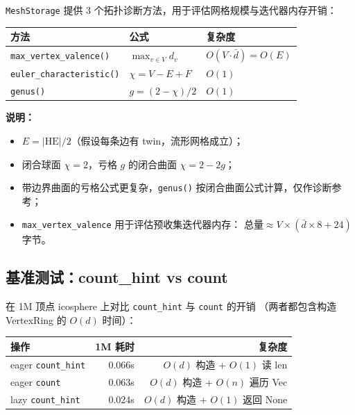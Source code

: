 \documentclass[11pt,a4paper]{article}
\begin{document}
\texttt{MeshStorage} 提供 3 个拓扑诊断方法，用于评估网格规模与迭代器内存开销：

\begin{center}
\renewcommand{\arraystretch}{1.18}
\begin{tabular}{@{}lll@{}}
  \toprule
  \textbf{方法} & \textbf{公式} & \textbf{复杂度} \\
  \midrule
  \texttt{max\_vertex\_valence()} & $\max_{v \in V} d_v$ & $O(V \cdot \bar{d}) = O(E)$ \\
  \texttt{euler\_characteristic()} & $\chi = V - E + F$ & $O(1)$ \\
  \texttt{genus()} & $g = (2 - \chi) / 2$ & $O(1)$ \\
  \bottomrule
\end{tabular}
\end{center}

\textbf{说明：}
\begin{itemize}
  \item $E = |\text{HE}| / 2$（假设每条边有 twin，流形网格成立）；
  \item 闭合球面 $\chi = 2$，亏格 $g$ 的闭合曲面 $\chi = 2 - 2g$；
  \item 带边界曲面的亏格公式更复杂，\texttt{genus()} 按闭合曲面公式计算，仅作诊断参考；
  \item \texttt{max\_vertex\_valence} 用于评估预收集迭代器内存：
        $\text{总量} \approx V \times (\bar{d} \times 8 + 24)$ 字节。
\end{itemize}

\subsection{基准测试：count\_hint vs count}

在 1M 顶点 icosphere 上对比 \texttt{count\_hint} 与 \texttt{count} 的开销
（两者都包含构造 VertexRing 的 $O(d)$ 时间）：

\begin{center}
\renewcommand{\arraystretch}{1.18}
\begin{tabular}{@{}lrr@{}}
  \toprule
  \textbf{操作} & \textbf{1M 耗时} & \textbf{复杂度} \\
  \midrule
  eager \texttt{count\_hint} & 0.066s & $O(d)$ 构造 + $O(1)$ 读 len \\
  eager \texttt{count}        & 0.063s & $O(d)$ 构造 + $O(n)$ 遍历 Vec \\
  lazy  \texttt{count\_hint} & 0.024s & $O(d)$ 构造 + $O(1)$ 返回 None \\
  \bottomrule
\end{tabular}
\end{center}
\end{document}
